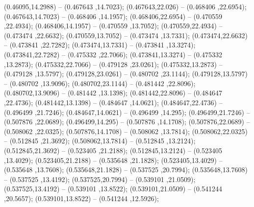  (0.46095,14.2988) -- (0.467643 ,14.7023);
 (0.467643,22.026) -- (0.468406 ,22.6954);
 (0.467643,14.7023) -- (0.468406 ,14.1957);
 (0.468406,22.6954) -- (0.470559 ,22.4934);
 (0.468406,14.1957) -- (0.470559 ,13.7052);
 (0.470559,22.4934) -- (0.473474 ,22.6632);
 (0.470559,13.7052) -- (0.473474 ,13.7331);
 (0.473474,22.6632) -- (0.473841 ,22.7282);
 (0.473474,13.7331) -- (0.473841 ,13.3274);
 (0.473841,22.7282) -- (0.475332 ,22.7066);
 (0.473841,13.3274) -- (0.475332 ,13.2873);
 (0.475332,22.7066) -- (0.479128 ,23.0261);
 (0.475332,13.2873) -- (0.479128 ,13.5797);
 (0.479128,23.0261) -- (0.480702 ,23.1144);
 (0.479128,13.5797) -- (0.480702 ,13.9096);
 (0.480702,23.1144) -- (0.481442 ,22.8096);
 (0.480702,13.9096) -- (0.481442 ,13.1398);
 (0.481442,22.8096) -- (0.484647 ,22.4736);
 (0.481442,13.1398) -- (0.484647 ,14.0621);
 (0.484647,22.4736) -- (0.496499 ,21.7246);
 (0.484647,14.0621) -- (0.496499 ,14.295);
 (0.496499,21.7246) -- (0.507876 ,22.0689);
 (0.496499,14.295) -- (0.507876 ,14.1708);
 (0.507876,22.0689) -- (0.508062 ,22.0325);
 (0.507876,14.1708) -- (0.508062 ,13.7814);
 (0.508062,22.0325) -- (0.512845 ,21.3692);
 (0.508062,13.7814) -- (0.512845 ,13.2124);
 (0.512845,21.3692) -- (0.523405 ,21.2188);
 (0.512845,13.2124) -- (0.523405 ,13.4029);
 (0.523405,21.2188) -- (0.535648 ,21.1828);
 (0.523405,13.4029) -- (0.535648 ,13.7608);
 (0.535648,21.1828) -- (0.537525 ,20.7994);
 (0.535648,13.7608) -- (0.537525 ,13.4192);
 (0.537525,20.7994) -- (0.539101 ,21.0509);
 (0.537525,13.4192) -- (0.539101 ,13.8522);
 (0.539101,21.0509) -- (0.541244 ,20.5657);
 (0.539101,13.8522) -- (0.541244 ,12.5926);
